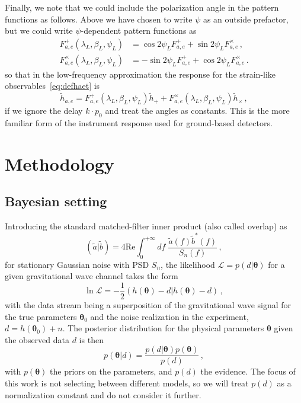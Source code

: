 \documentclass[aps,showpacs,twocolumn,prd,superscriptaddress,nofootinbib]{revtex4-1}
\newcommand{\be}{\begin{equation}}
\newcommand{\ee}{\end{equation}}
\newcommand{\bsub}{\begin{subequations}}
\newcommand{\esub}{\end{subequations}}
\newcommand\calL{{\mathcal{L}}}
\newcommand\betaL{{\beta_{L}}}
\newcommand\lambdaL{{\lambda_{L}}}
\newcommand\psiL{{\psi_{L}}}
\begin{document}
Finally, we note that we could include the polarization angle in the pattern functions as follows. Above we have chosen to write $\psi$ as an outside prefactor, but we could write $\psi$-dependent pattern functions as
\bsub
\begin{align}
	F^{+}_{a,e}(\lambdaL, \betaL, \psiL) &= \cos 2\psiL F^{+}_{a,e} + \sin 2\psiL F^{\times}_{a,e} \,,\\
	F^{\times}_{a,e}(\lambdaL, \betaL, \psiL) &= -\sin 2\psiL F^{+}_{a,e} + \cos 2\psiL F^{\times}_{a,e} \,.
\end{align}
\esub
so that in the low-frequency approximation the response for the strain-like observables~\eqref{eq:defhaet} is
\be
	\tilde{h}_{a,e} = F^{+}_{a,e}(\lambdaL, \betaL, \psiL) \tilde{h}_{+} + F^{\times}_{a,e}(\lambdaL, \betaL, \psiL) \tilde{h}_{\times} \,,
\ee
if we ignore the delay $k \cdot p_{0}$ and treat the angles as constants. This is the more familiar form of the instrument response used for ground-based detectors.



\section{Methodology}
\label{sec:method}


\subsection{Bayesian setting}
\label{subsec:bayes}

Introducing the standard matched-filter inner product (also called overlap) as
\be\label{eq:definnerproduct}
	( \tilde{a} | \tilde{b} ) = 4 \mathrm{Re} \int_{0}^{+\infty} df \; \frac{\tilde{a}(f) \tilde{b}^{*}(f)}{S_{n}(f)} \,,
\ee
for stationary Gaussian noise with PSD $S_{n}$, the likelihood $\calL = p(d | \bm{\theta})$ for a given gravitational wave channel takes the form
\be\label{eq:deflnL}
	\ln \calL = -\frac{1}{2} \left( h(\bm{\theta}) - d | h(\bm{\theta}) - d \right) \,,
\ee
with the data stream being a superposition of the gravitational wave signal for the true parameters $\bm{\theta}_{0}$ and the noise realization in the experiment, $d = h(\bm{\theta}_{0}) + n$.
The posterior distribution for the physical parameters $\bm{\theta}$ given the observed data $d$ is then \be\label{eq:defBayes}
	p\left( \bm{\theta} | d \right) = \frac{p(d | \bm{\theta})p(\bm{\theta})}{p(d)}\,,
\ee
with $p(\bm{\theta})$ the priors on the parameters, and $p(d)$ the evidence.
The focus of this work is not selecting between different models, so we will treat $p(d)$ as a normalization constant and do not consider it further.
\end{document}

